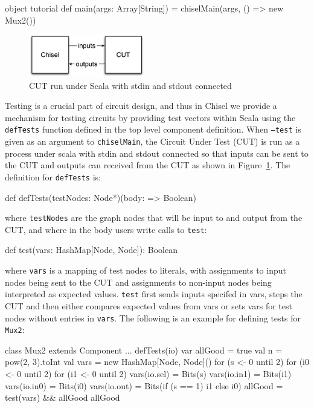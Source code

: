 \documentclass[twocolumn,10pt]{article}
\def\code#1{{\tt #1}}
\begin{document}
\begin{scala}
object tutorial {
  def main(args: Array[String]) = {
    chiselMain(args, () => new Mux2())
  }
}
\end{scala}

\begin{figure}
\begin{center}
\includegraphics[width=0.45\textwidth]{CUT.pdf}
\end{center}
\caption{CUT run under Scala with stdin and stdout connected}
\label{fig:cut}
\end{figure}
 
Testing is a crucial part of circuit design, 
and thus in Chisel we provide a mechanism for
testing circuits by providing test vectors within Scala using
the \code{defTests} function defined in the top level component
definition.
When \code{--test} is given as an argument to \code{chiselMain}, 
the Circuit Under Test (CUT) is run as a process under scala with stdin and stdout
connected so that inputs can be sent to the CUT and outputs can
received from the CUT as shown in Figure~\ref{fig:cut}.  
The definition for \code{defTests} is:

\begin{scala}
def defTests(testNodes: Node*)(body: => Boolean)
\end{scala}

\noindent
where \code{testNodes} are the graph nodes that will be input to and
output from the CUT, and where
in the body users write calls to \code{test}:

\begin{scala}
def test(vars: HashMap[Node, Node]): Boolean
\end{scala}

\noindent
where \code{vars} is a mapping of test nodes to literals, 
with assignments to input nodes being sent to the CUT and assignments to
non-input nodes being interpreted as expected values.
\code{test} first sends inputs specifed in vars, steps the CUT and then either
compares expected values from vars or sets vars for test nodes without
entries in \code{vars}.
The following is an example for defining tests for \code{Mux2}:

\begin{scala}
class Mux2 extends Component {
  ...
  defTests(io) {
    var allGood = true
    val n = pow(2, 3).toInt
    val vars = new HashMap[Node, Node]()
    for (s <- 0 until 2) {
    for (i0 <- 0 until 2) {
    for (i1 <- 0 until 2) {
      vars(io.sel) = Bits(s)
      vars(io.in1) = Bits(i1)
      vars(io.in0) = Bits(i0)
      vars(io.out) = Bits(if (s == 1) i1 else i0)
      allGood = test(vars) && allGood
    } } }
    allGood
  }
}
\end{scala}
\end{document}
